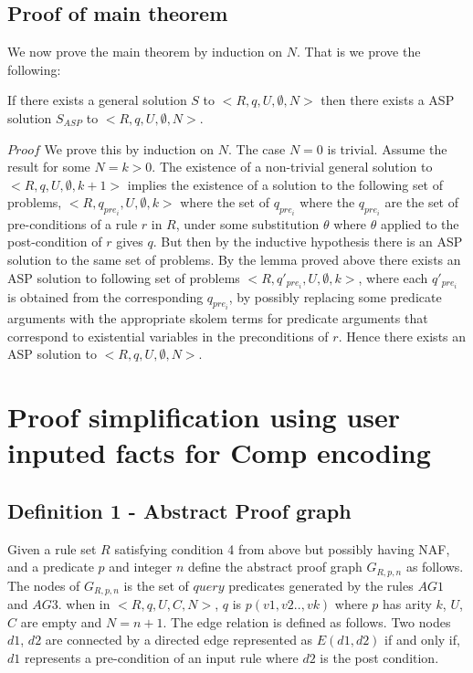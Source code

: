 \documentclass[sigconf]{acmart}
\begin{document}
\subsection{Proof of main theorem}
We now prove the main theorem by induction on $N$. That is we prove the following:\\
\begin{theorem}[Completeness]\label{completeness}If there exists a general solution $S$ to $<R,q,U,\emptyset,N>$ then there exists a ASP solution $S_{ASP}$ to $<R,q,U,\emptyset,N>$.
\end{theorem}
$Proof$ We prove this by induction on $N$. The case $N=0$ is trivial. Assume the result for some $N=k>0$. The existence of a non-trivial general solution to $<R,q,U,\emptyset,k+1>$ implies the existence of a solution to the following set of problems, $<R,q_{pre_{i}},U,\emptyset,k>$ where the set of $q_{pre_{i}}$ where the $q_{pre_{i}}$ are the set of pre-conditions of a rule $r$ in $R$, under some substitution $\theta$ where $\theta$ applied to the post-condition of $r$ gives $q$. But then by the inductive hypothesis there is an ASP solution to the same set of problems. By the lemma proved above there exists an ASP solution to following set of problems $<R,q'_{pre_{i}},U,\emptyset,k>$, where each $q'_{pre_{i}}$ is obtained from the corresponding $q_{pre_{i}}$, by possibly replacing some predicate arguments with the appropriate skolem terms for predicate arguments that correspond to existential variables in the preconditions of $r$. Hence there exists an ASP solution to $<R,q,U,\emptyset,N>$.

\section{Proof simplification using user inputed facts for Comp encoding}\label{sec:proof_simplification}
\subsection{Definition 1 - Abstract Proof graph}
Given a rule set $R$ satisfying condition 4 from above but possibly having NAF, and a predicate $p$ and integer $n$ define the abstract proof graph $G_{R,p,n}$ as follows. The nodes of $G_{R,p,n}$ is the set of $query$ predicates generated by the rules $AG1$ and $AG3$. when in $<R,q,U,C,N>$, $q$ is $p(v1,v2..,vk)$ where $p$ has arity $k$, $U$, $C$ are empty and $N = n+1$. The edge relation is defined as follows. Two nodes $d1$, $d2$ are connected by a directed edge represented as $E(d1,d2)$ if and only if, $d1$ represents a pre-condition of an input rule where $d2$ is the post condition. 
\end{document}

